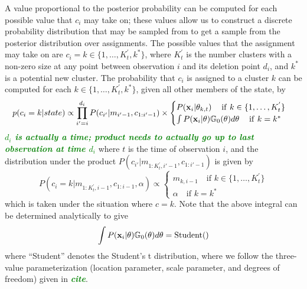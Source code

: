 \documentclass[smallcondensed, final]{svjour3}
\newcommand{\willie}[1]{\textcolor{green}{\textsf{\emph{\textbf{\textcolor{green}{#1}}}}}}
\begin{document}
A value proportional to the posterior probability can be computed for each possible value that $c_{i}$ may take on; these values allow us to construct a discrete probability distribution that may be sampled from to get a sample from the posterior distribution over assignments. The possible values that the assignment may take on are $c_{i} = k \in \{ 1 , \ldots ,  K_{t}^{'}, k^{*}\}$, where $K_{t}^{'}$ is the number clusters with a non-zero size at any point between observation $i$ and its deletion point $d_{i}$, and $k^{*}$ is a potential new cluster. The probability that $c_{i}$ is assigned to a cluster $k$ can be computed for each $k \in \{ 1 , \ldots ,  K_{t}^{'}, k^{*} \}$, given all other members of the state, by
\begin{equation}
p(c_{i} = k | state) \propto \prod_{i' = i}^{d_{i}} P(c_{i'} | m_{i'-1}, c_{1:i'-1}) \newline \times
\begin{cases}
	P(\bold{x}_{i} | \theta_{k,t})                                        \hspace{12pt} \text{if} \hspace{4pt} k \in \{ 1, \ldots, K_{t}^{'} \} \\
	\int P(\bold{x}_{i} | \theta) \mathbb{G}_{0}(\theta) d\theta    \hspace{12pt} \text{if}  \hspace{4pt}  k = k^{*}
\end{cases}
\end{equation}
\willie{$d_{i}$ is actually a time; product needs to actually go up to last observation at time $d_{i}$} where $t$ is the time of observation $i$, and the distribution under the product $P(c_{i'} | m_{1:K_{t}^{'}, i'-1}, c_{1:i'-1})$ is given by 
\begin{equation}
P(c_{i} = k | m_{1:K_{t}^{'}, i-1}, c_{1:i-1}, \alpha) \propto 
\begin{cases}
m_{k, i-1} \hspace{12pt} \text{if} \hspace{4pt} k \in \{ 1, \ldots, K_{t}^{'} \} \\
\alpha \hspace{12pt} \text{if}  \hspace{4pt}  k = k^{*}
\end{cases}
\end{equation}
which is taken under the situation where $c = k$. Note that the above integral can be determined analytically to give
\begin{equation}
\label{marginal_obs_prob}
\int P(\bold{x}_{i} | \theta) \mathbb{G}_{0}(\theta)d\theta = \text{Student}()
\end{equation}
where ``Student'' denotes the Student's t distribution, where we follow the three-value parameterization (location parameter, scale parameter, and degrees of freedom) given in \willie{cite}.
\end{document}
